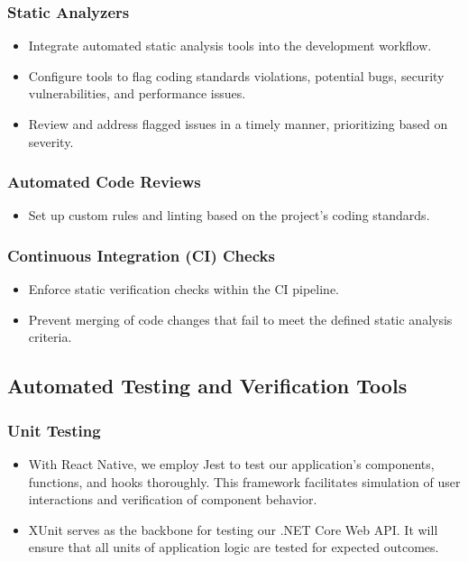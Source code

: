\documentclass[12pt, titlepage]{article}
\begin{document}
    \subsubsection{Static Analyzers}
    \begin{itemize}
        \item Integrate automated static analysis tools into the development workflow.
        \item Configure tools to flag coding standards violations, potential bugs, security vulnerabilities, and performance issues.
        \item Review and address flagged issues in a timely manner, prioritizing based on severity.
    \end{itemize}

    \subsubsection{Automated Code Reviews}
    \begin{itemize}
        \item Set up custom rules and linting based on the project’s coding standards.
    \end{itemize}

    \subsubsection{Continuous Integration (CI) Checks}
    \begin{itemize}
        \item Enforce static verification checks within the CI pipeline.
        \item Prevent merging of code changes that fail to meet the defined static analysis criteria.
    \end{itemize}

    \subsection{Automated Testing and Verification Tools}

    \subsubsection{Unit Testing}
    \begin{itemize}
        \item With React Native, we employ Jest to test our application's components, functions, and hooks thoroughly. This framework facilitates simulation of user interactions and verification of component behavior.
        \item XUnit serves as the backbone for testing our .NET Core Web API. It will ensure that all units of application logic are tested for expected outcomes.
    \end{itemize}
\end{document}
